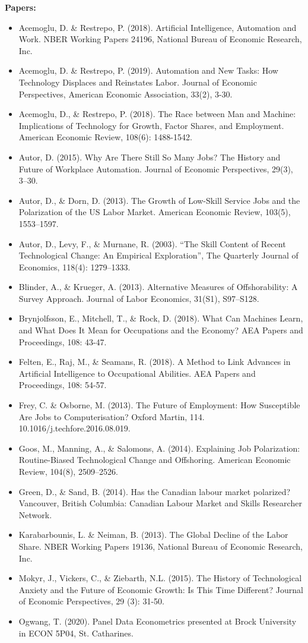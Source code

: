 \documentclass[12pt]{article}
\begin{document}
\begin{flushleft}
\textbf{Papers:}
\begin{itemize}
\item Acemoglu, D. \& Restrepo, P. (2018). Artificial Intelligence, Automation and Work. NBER Working Papers 24196, National Bureau of Economic Research, Inc.
\item Acemoglu, D. \& Restrepo, P. (2019). Automation and New Tasks: How Technology Displaces and Reinstates Labor. Journal of Economic Perspectives, American Economic Association, 33(2), 3-30.
\item Acemoglu, D., \& Restrepo, P. (2018). The Race between Man and Machine: Implications of Technology for Growth, Factor Shares, and Employment. American Economic Review, 108(6): 1488-1542.
\item Autor, D. (2015). Why Are There Still So Many Jobs? The History and Future of Workplace Automation. Journal of Economic Perspectives, 29(3), 3–30.
\item Autor, D., \& Dorn, D. (2013). The Growth of Low-Skill Service Jobs and the Polarization of the US Labor Market. American Economic Review, 103(5), 1553–1597.
\item Autor, D., Levy, F., \& Murnane, R. (2003). “The Skill Content of Recent Technological Change: An Empirical Exploration”, The Quarterly Journal of Economics, 118(4): 1279–1333.
\item Blinder, A., \& Krueger, A. (2013). Alternative Measures of Offshorability: A Survey Approach. Journal of Labor Economics, 31(S1), S97–S128.
\item Brynjolfsson, E., Mitchell, T., \& Rock, D. (2018). What Can Machines Learn, and What Does It Mean for Occupations and the Economy? AEA Papers and Proceedings, 108: 43-47.
\item Felten, E., Raj, M., \& Seamans, R. (2018). A Method to Link Advances in Artificial Intelligence to Occupational Abilities. AEA Papers and Proceedings, 108: 54-57.
\item Frey, C. \& Osborne, M. (2013). The Future of Employment: How Susceptible Are Jobs to Computerisation? Oxford Martin, 114. 10.1016/j.techfore.2016.08.019.
\item Goos, M., Manning, A., \& Salomons, A. (2014). Explaining Job Polarization: Routine-Biased Technological Change and Offshoring. American Economic Review, 104(8), 2509–2526.
\item Green, D., \& Sand, B. (2014). Has the Canadian labour market polarized? Vancouver, British Columbia: Canadian Labour Market and Skills Researcher Network.
\item Karabarbounis, L. \& Neiman, B. (2013). The Global Decline of the Labor Share. NBER Working Papers 19136, National Bureau of Economic Research, Inc.
\item Mokyr, J., Vickers, C., \& Ziebarth, N.L. (2015). The History of Technological Anxiety and the Future of Economic Growth: Is This Time Different? Journal of Economic Perspectives, 29 (3): 31-50.
\item Ogwang, T. (2020). Panel Data Econometrics presented at Brock University in ECON 5P04, St. Catharines.
\end{itemize}


\end{flushleft}
\end{document}
